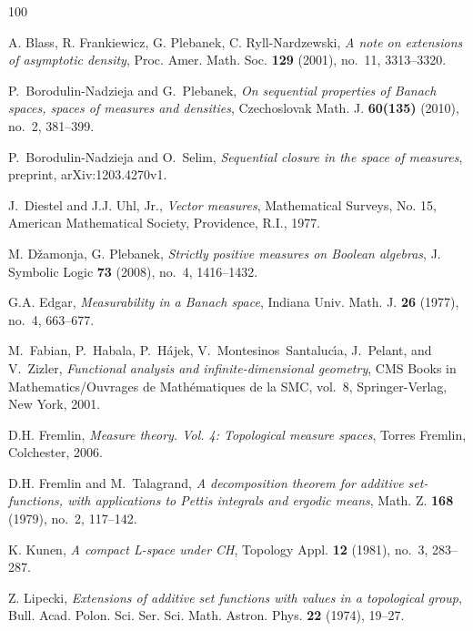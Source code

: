 \documentclass[12pt]{amsart}
\newcommand{\0}{\protect{\bf 0}}
\newcommand{\1}{\protect{\bf 1}}
\theoremstyle{definition}
\theoremstyle{remark}
\numberwithin{equation}{section}
\begin{document}
\begin{thebibliography}{100}

 A. Blass, R. Frankiewicz, G. Plebanek,  C. Ryll-Nardzewski, 
{\em A note on extensions of asymptotic density}, Proc. Amer. Math. Soc. \textbf{129} (2001), no.~11, 3313--3320.

 P.~Borodulin-Nadzieja and G.~Plebanek, 
\emph{On sequential properties of Banach spaces, spaces of measures and densities}, 
Czechoslovak Math. J. \textbf{60(135)} (2010), no.~2, 381--399.

 P.~Borodulin-Nadzieja and O.~Selim, 
\emph{Sequential closure in the space of measures}, preprint, arXiv:1203.4270v1.

 J.~Diestel and J.J. Uhl, Jr., \emph{Vector measures}, 
Mathematical Surveys, No. 15, American Mathematical Society, Providence, R.I., 1977. 

 M. D\v{z}amonja, G. Plebanek, {\em Strictly positive measures on Boolean algebras},  
J. Symbolic Logic {\bf 73} (2008), no.~4, 1416--1432.

G.A. Edgar, \emph{Measurability in a Banach space}, Indiana Univ. Math. J.
  \textbf{26} (1977), no.~4, 663--677. 


M.~Fabian, P.~Habala, P.~H{\'a}jek, V.~Montesinos~Santaluc{\'{\i}}a, J.~Pelant,
  and V.~Zizler, \emph{Functional analysis and infinite-dimensional geometry},
  CMS Books in Mathematics/Ouvrages de Math\'ematiques de la SMC, vol.~8,
  Springer-Verlag, New York, 2001.


D.H. Fremlin, \emph{Measure theory. {V}ol. 4: Topological measure spaces},
Torres Fremlin, Colchester, 2006.

D.H. Fremlin and M.~Talagrand, \emph{A decomposition theorem for additive
  set-functions, with applications to {P}ettis integrals and ergodic means},
  Math. Z. \textbf{168} (1979), no.~2, 117--142. 

 K. Kunen, {\em A compact L-space under CH}, Topology Appl. \textbf{12} (1981), no.~3, 283--287. 

Z. Lipecki, \emph{Extensions of additive set functions with values
in a topological group}, Bull. Acad. Polon. Sci. Ser. Sci. Math. Astron. Phys. 
\textbf{22} (1974), 19--27.



\end{thebibliography}
\end{document}
